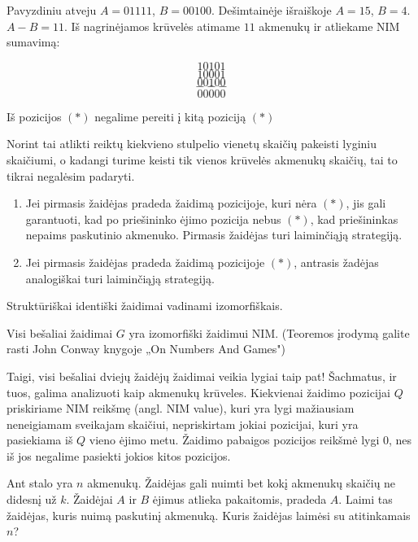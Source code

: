 Pavyzdiniu atveju $A = 01111$, $B = 00100$. Dešimtainėje išraiškoje $A =
15$, $B = 4$. $A - B = 11$. Iš nagrinėjamos krūvelės atimame $11$ akmenukų ir
atliekame NIM sumavimą: 

$$10101$$$$10001$$$$00100$$$$---$$$$00000$$

\begin{teig}
  Iš pozicijos $(*)$ negalime pereiti į kitą poziciją $(*)$
\end{teig}

Norint tai atlikti reiktų kiekvieno stulpelio vienetų skaičių pakeisti
lyginiu skaičiumi, o kadangi turime keisti tik vienos krūvelės akmenukų
skaičių, tai to tikrai negalėsim padaryti.

\begin{enumerate}
  \item Jei pirmasis žaidėjas pradeda žaidimą pozicijoje, kuri nėra $(*)$,
    jis gali garantuoti, kad po priešininko ėjimo pozicija nebus $(*)$, kad
    priešininkas nepaims paskutinio akmenuko. Pirmasis žaidėjas turi
    laiminčiąją strategiją.
  \item Jei pirmasis žaidėjas pradeda žaidimą pozicijoje $(*)$, antrasis
    žadėjas analogiškai turi laiminčiąją strategiją. 
\end{enumerate}

\begin{api}
  Struktūriškai identiški žaidimai vadinami izomorfiškais. 
\end{api}

\begin{thm} 
  Visi bešaliai žaidimai $G$ yra izomorfiški žaidimui NIM. (Teoremos
  įrodymą galite rasti John Conway knygoje „On Numbers And Games")
\end{thm}

Taigi, visi bešaliai dviejų žaidėjų žaidimai veikia lygiai taip pat!
Šachmatus, ir tuos, galima analizuoti kaip akmenukų krūveles. Kiekvienai
žaidimo pozicijai $Q$ priskiriame NIM reikšmę (angl. NIM value), kuri yra
lygi mažiausiam neneigiamam sveikajam skaičiui, nepriskirtam jokiai
pozicijai, kuri yra pasiekiama iš $Q$ vieno ėjimo metu. Žaidimo pabaigos
pozicijos reikšmė lygi $0$, nes iš jos negalime pasiekti jokios kitos
pozicijos. 

\begin{pavnr}
  Ant stalo yra $n$ akmenukų. Žaidėjas gali nuimti bet kokį akmenukų
  skaičių ne didesnį už $k$. Žaidėjai $A$ ir $B$ ėjimus atlieka pakaitomis,
  pradeda $A$.  Laimi tas žaidėjas, kuris nuimą paskutinį akmenuką. Kuris
  žaidėjas laimėsi su atitinkamais $n$?
\end{pavnr}

